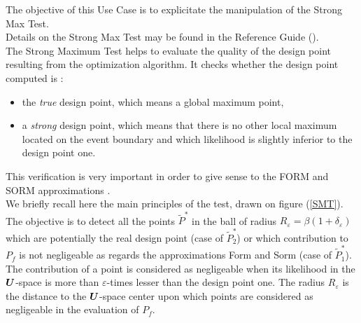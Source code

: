 \renewcommand{\filename}{docUC_ThresholdExceedance_StrongMaxTest.tex}
\renewcommand{\filetitle}{UC : Validate the design point with the Strong Maximum Test}

\HeaderIIILevel





The objective of this Use Case is to explicitate the manipulation of the Strong Max Test. \\

Details on the Strong Max Test  may be found in the Reference Guide ().\\

The Strong Maximum Test helps to evaluate the quality of the design point resulting from the optimization algorithm. It checks whether the design point computed is :
\begin{itemize}
\item the {\em true} design point, which means a global maximum point,
\item a {\em strong} design point, which means that there is no other local maximum located on the event boundary and which likelihood is slightly inferior to the design point one.
\end{itemize}
This verification is very important in order to give sense to the FORM and SORM approximations .\\


We briefly recall here the main principles of the test, drawn on figure (\ref{SMT}).\\
The objective is to detect all the points $\tilde{P}^*$ in the ball of radius $R_{\varepsilon} = \beta(1+\delta_{\varepsilon})$ which are potentially the real design point (case of $\tilde{P}_2^*$) or which contribution to $P_f$ is not negligeable as regards the approximations Form and Sorm (case of $\tilde{P}_1^*$). The contribution of a point is considered as negligeable when its likelihood in the ${\boldsymbol{U}}$-space is more than $\varepsilon$-times lesser than the design point one. The radius $R_{\varepsilon}$ is the distance to the ${\boldsymbol{U}}$-space center upon which points are considered as negligeable in the evaluation of $P_f$.\\

